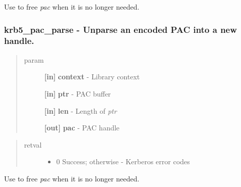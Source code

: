 \documentclass[letterpaper,10pt,english]{sphinxmanual}
\begin{document}
Use {\hyperref[appdev/refs/api/krb5_pac_free:krb5_pac_free]{}} to free \emph{pac} when it is no longer needed.


\subsubsection{krb5\_pac\_parse -  Unparse an encoded PAC into a new handle.}
\label{appdev/refs/api/krb5_pac_parse:krb5-pac-parse-unparse-an-encoded-pac-into-a-new-handle}\label{appdev/refs/api/krb5_pac_parse::doc}

\begin{fulllineitems}
\label{appdev/refs/api/krb5_pac_parse:krb5_pac_parse}
\end{fulllineitems}

\begin{quote}\begin{description}
\item[{param}] \leavevmode
\textbf{{[}in{]}} \textbf{context} - Library context

\textbf{{[}in{]}} \textbf{ptr} - PAC buffer

\textbf{{[}in{]}} \textbf{len} - Length of \emph{ptr}

\textbf{{[}out{]}} \textbf{pac} - PAC handle

\end{description}\end{quote}
\begin{quote}\begin{description}
\item[{retval}] \leavevmode\begin{itemize}
\item {} 
0   Success; otherwise - Kerberos error codes

\end{itemize}

\end{description}\end{quote}

Use {\hyperref[appdev/refs/api/krb5_pac_free:krb5_pac_free]{}} to free \emph{pac} when it is no longer needed.
\end{document}
